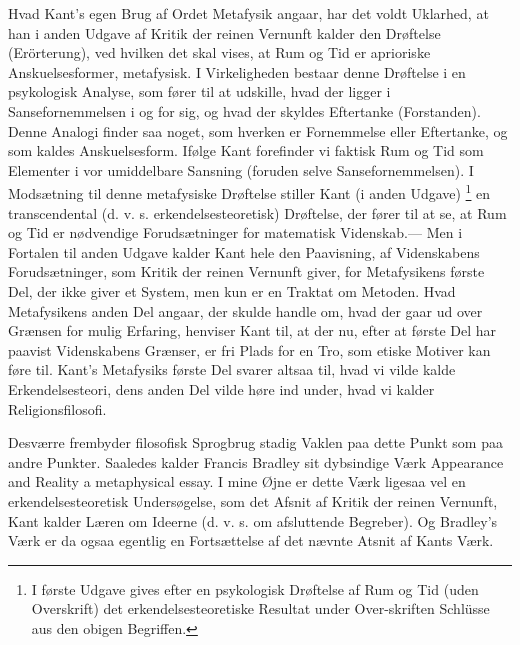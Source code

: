 \documentclass[12pt]{article}
\newcommand{\apage}[1]{\marginnote{\footnotesize\textit{[#1]}}}
\begin{document}
Hvad Kant's egen Brug af Ordet Metafysik angaar, har det voldt Uklarhed, at han
i anden Udgave af \guillemotright{}Kritik der reinen Vernunft\guillemotleft{}
kalder den Drøftelse (\guillemotright{}Erörterung\guillemotleft{}), ved hvilken
det skal vises, at Rum og Tid er aprioriske Anskuelsesformer,
\guillemotright{}metafysisk\guillemotleft{}. I Virkeligheden bestaar denne
Drøftelse i en psykologisk Analyse, som fører til at udskille, hvad der ligger
i Sansefornemmelsen i og for sig, og hvad der skyldes Eftertanke
(\guillemotright{}Forstanden\guillemotleft{}). Denne Analogi finder saa noget,
som hverken er Fornemmelse eller Eftertanke, og som kaldes
\guillemotright{}Anskuelsesform\guillemotleft{}. Ifølge Kant forefinder vi
faktisk Rum og Tid som Elementer i vor umiddelbare Sansning (foruden selve
Sansefornemmelsen). I Modsætning til denne
\guillemotright{}metafysiske\guillemotleft{} Drøftelse stiller Kant (i anden Udgave)
      \footnote{I første Udgave gives efter en psykologisk Drøftelse af Rum og
Tid (uden Overskrift) det erkendelsesteoretiske Resultat under Over-skriften
\guillemotright{}Schlüsse aus den obigen Begriffen\guillemotleft{}.} %
 en transcendental (d. v. s. erkendelsesteoretisk) Drøftelse, der fører til at
se, at Rum og Tid er nødvendige Forudsætninger for matematisk Videnskab.--- Men
i Fortalen til anden Udgave kalder Kant hele den Paavisning, af Videnskabens
Forudsætninger, som \guillemotright{}Kritik der reinen Vernunft\guillemotleft{}
giver, for \guillemotright{}Metafysikens første Del\guillemotleft{}, der ikke
giver et System, men kun er en \guillemotright{}Traktat om
Metoden.\guillemotleft{} Hvad \guillemotright{}Metafysikens anden
Del\guillemotleft{} angaar, der skulde handle om, hvad der gaar ud over Grænsen
for mulig Erfaring, henviser Kant til, at der nu, efter at første Del har
paavist Videnskabens Grænser, er fri Plads for en Tro, som etiske Motiver kan
føre til. Kant's \guillemotright{}Metafysik\guillemotleft{}s første Del svarer
altsaa til, hvad vi vilde kalde Erkendelsesteori, dens anden Del vilde høre ind
under, hvad vi kalder Religionsfilosofi.

Desværre frembyder filosofisk Sprogbrug stadig Vaklen paa dette Punkt som paa
andre Punkter. Saaledes kalder Francis Bradley
\setcounter{footnote}{0}%
\apage{88}sit dybsindige Værk \guillemotright{}Appearance and
Reality\guillemotleft{} \guillemotright{}a metaphysical essay\guillemotleft{}.
I mine Øjne er dette Værk ligesaa vel en erkendelsesteoretisk Undersøgelse, som
det Afsnit af \guillemotright{}Kritik der reinen Vernunft\guillemotleft{}, Kant
kalder Læren om \guillemotright{}Ideerne\guillemotleft{} (d. v. s. om
afsluttende Begreber). Og Bradley's Værk er da ogsaa egentlig en Fortsættelse
af det nævnte Atsnit af Kants Værk.
\end{document}
